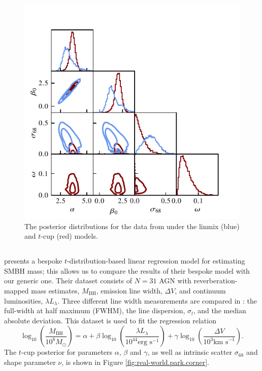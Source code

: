 \documentclass[fleqn,usenatbib]{rasti}
\begin{document}
\begin{figure}
    \includegraphics[width=\columnwidth]{graphics/real/corner_kelly.pdf}
    \caption{The posterior distributions for the data from \citet{Kelly:2007}
    under the linmix (blue) and $t$-cup (red) models.}
    \label{fig:real-world.kelly.corner}
\end{figure}

\subsection[Park et al. (2017)]{\citet{Park:2017}}

\citet{Park:2017} presents a bespoke $t$-distribution-based linear regression
model for estimating SMBH mass; this allows us to compare the results of their
bespoke model with our generic one. Their dataset consists of $N = 31$ AGN with
reverberation-mapped mass estimates, $M_{\text{BH}}$,  emission line
width, $\Delta V$, and continuum luminosities, $\lambda L_{\lambda}$. Three
different  line width measurements are compared in \citet{Park:2017}:
the full-width at half maximum (FWHM), the line dispersion, $\sigma_l$, and the
median absolute deviation. This dataset is used to fit the regression relation
\begin{equation}
    \log_{10}\!\left( \frac{M_{\text{BH}}}{10^8 M_\odot} \right)\! =
        \alpha +
        \beta \log_{10}\! \left( \frac{\lambda L_{\lambda}}{10^{44} \text{erg s}^{-1}} \right) +
        \gamma \log_{10}\!\left( \frac{\Delta V}{10^3 \text{km s}^{-1}} \right).
        \label{eqn:real-world.park}
\end{equation}
The $t$-cup posterior for parameters $\alpha$, $\beta$ and $\gamma$, as well as
intrinsic scatter $\sigma_{68}$ and shape parameter $\nu$, is shown in Figure
\ref{fig:real-world.park.corner}.
\end{document}
